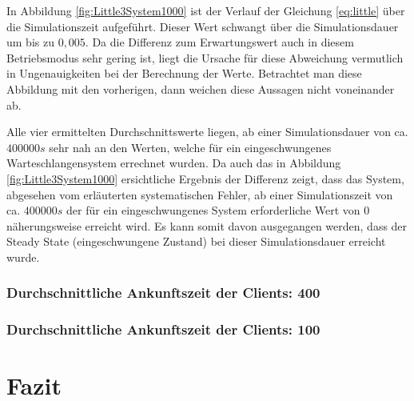 In Abbildung \ref{fig:Little3System1000} ist der Verlauf der Gleichung \ref{eq:little} über die Simulationszeit aufgeführt. 
Dieser Wert schwangt über die Simulationsdauer um bis zu $0,005$. Da die Differenz zum Erwartungswert auch in diesem Betriebsmodus sehr gering ist, liegt die Ursache für diese Abweichung vermutlich in Ungenauigkeiten bei der Berechnung der Werte. Betrachtet man diese Abbildung mit den vorherigen, dann weichen diese Aussagen nicht voneinander ab.

Alle vier ermittelten Durchschnittswerte liegen, ab einer Simulationsdauer von ca. $400000s$ sehr nah an den Werten, welche für ein eingeschwungenes Warteschlangensystem errechnet wurden. Da auch das in Abbildung  \ref{fig:Little3System1000} ersichtliche Ergebnis der Differenz zeigt, dass das System, abgesehen vom erläuterten systematischen Fehler, ab einer Simulationszeit von ca. $400000s$ der für ein eingeschwungenes System erforderliche Wert von $0$ näherungsweise erreicht wird. Es kann somit davon ausgegangen werden, dass der Steady State (eingeschwungene Zustand) bei dieser Simulationsdauer erreicht wurde.

\subsubsection{Durchschnittliche Ankunftszeit der Clients: 400}
\subsubsection{Durchschnittliche Ankunftszeit der Clients: 100}

\section{Fazit}

%
 


